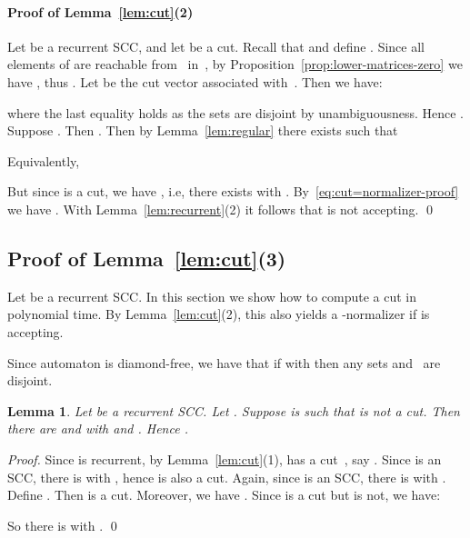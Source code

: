 \documentclass{elsarticle}
\newtheorem{lemma}[definition]{Lemma}
\begin{document}
\paragraph{Proof of Lemma~\ref{lem:cut}(2)}

Let  be a recurrent SCC, and let  be a cut.
Recall that  and define .
Since all elements of  are reachable from~ in~, by Proposition~\ref{prop:lower-matrices-zero} we have , thus .
Let  be the cut vector associated with~.
Then we have:

where the last equality holds as the sets  are disjoint by unambiguousness.
Hence .
Suppose .
Then .
Then by Lemma~\ref{lem:regular} there exists  such that

Equivalently,

But since  is a cut, we have , i.e, there exists  with .
By~\eqref{eq:cut=normalizer-proof} we have .
With Lemma~\ref{lem:recurrent}(2) it follows that  is not accepting.
\qed

\subsection{Proof of Lemma~\ref{lem:cut}(3)} \label{sub:computing-cuts}

Let  be a recurrent SCC.
In this section we show how to compute a cut in polynomial time.
By Lemma~\ref{lem:cut}(2), this also yields a -normalizer if  is accepting.

Since automaton  is diamond-free, we have that if  with  then any sets  and~ are disjoint.
\begin{lemma} \label{lem:get-larger}
Let  be a recurrent SCC.
Let .
Suppose  is such that  is not a cut.
Then there are  and  with  and .
Hence .
\end{lemma}
\begin{proof}
Since  is recurrent, by Lemma~\ref{lem:cut}(1),  has a cut~, say .
Since  is an SCC, there is  with , hence  is also a cut.
Again, since  is an SCC, there is  with .
Define .
Then  is a cut.
Moreover, we have .
Since  is a cut but  is not, we have:

So there is  with .
\qed
\end{proof}
\end{document}
